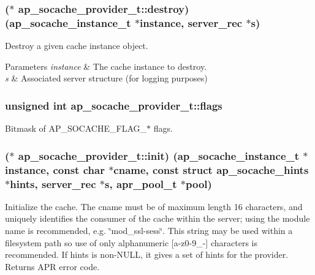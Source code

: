 \subsubsection[{\texorpdfstring{destroy}{destroy}}]{($\ast$ ap\+\_\+socache\+\_\+provider\+\_\+t\+::destroy) ({\bf ap\+\_\+socache\+\_\+instance\+\_\+t} $\ast$instance, {\bf server\+\_\+rec} $\ast${\bf s})}\hypertarget{structap__socache__provider__t_ad9a512cee36c6755408315dc12d2f720}{}\label{structap__socache__provider__t_ad9a512cee36c6755408315dc12d2f720}
Destroy a given cache instance object. 
\begin{DoxyParams}{Parameters}
{\em instance} & The cache instance to destroy. \\
\hline
{\em s} & Associated server structure (for logging purposes) \\
\hline
\end{DoxyParams}
\subsubsection[{\texorpdfstring{flags}{flags}}]{\setlength{\rightskip}{0pt plus 5cm}unsigned {\bf int} ap\+\_\+socache\+\_\+provider\+\_\+t\+::flags}\hypertarget{structap__socache__provider__t_a8cb231295671689e9757af48635c9086}{}\label{structap__socache__provider__t_a8cb231295671689e9757af48635c9086}
Bitmask of A\+P\+\_\+\+S\+O\+C\+A\+C\+H\+E\+\_\+\+F\+L\+A\+G\+\_\+$\ast$ flags. 
\subsubsection[{\texorpdfstring{init}{init}}]{($\ast$ ap\+\_\+socache\+\_\+provider\+\_\+t\+::init) ({\bf ap\+\_\+socache\+\_\+instance\+\_\+t} $\ast$instance, const char $\ast$cname, const struct {\bf ap\+\_\+socache\+\_\+hints} $\ast$hints, {\bf server\+\_\+rec} $\ast${\bf s}, {\bf apr\+\_\+pool\+\_\+t} $\ast${\bf pool})}\hypertarget{structap__socache__provider__t_aefa99a603983b4ec31267de908362e6b}{}\label{structap__socache__provider__t_aefa99a603983b4ec31267de908362e6b}
Initialize the cache. The cname must be of maximum length 16 characters, and uniquely identifies the consumer of the cache within the server; using the module name is recommended, e.\+g. \char`\"{}mod\+\_\+ssl-\/sess\char`\"{}. This string may be used within a filesystem path so use of only alphanumeric \mbox{[}a-\/z0-\/9\+\_\+-\/\mbox{]} characters is recommended. If hints is non-\/\+N\+U\+LL, it gives a set of hints for the provider. Returns A\+PR error code.


